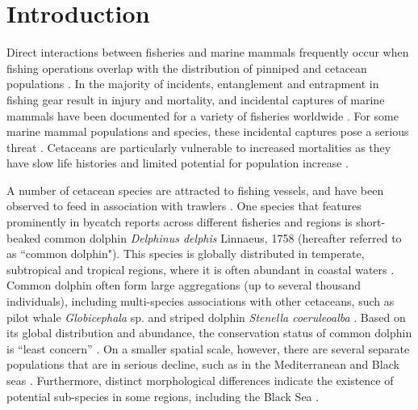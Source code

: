\documentclass[10pt]{article}
\begin{document}

\section*{Introduction}
Direct interactions between fisheries and marine mammals frequently occur when fishing operations overlap with the distribution of pinniped and cetacean populations \cite{chuenpagdee_collateral_2003, shaughnessy_review_2003, read_bycatch_2006}.  In the majority of incidents, entanglement and entrapment in fishing gear result in injury and mortality, and incidental captures of marine mammals have been documented for a variety of fisheries worldwide \cite{woodley_incidental_1991, fertl_cetacean_1997, hall_ecological_1998}.  For some marine mammal populations and species, these incidental captures pose a serious threat \cite{dawson_management_2005, reeves_global_2005, goldsworthy_risk_2007}.  Cetaceans are particularly vulnerable to increased mortalities as they have slow life histories and limited potential for population increase \cite{read_interactions_2008}.  

A number of cetacean species are attracted to fishing vessels, and have been observed to feed in association with trawlers \cite{chilvers_trawling_2001, rayment_observations_2009}.  One species that features prominently in bycatch reports across different fisheries and regions is short-beaked common dolphin \emph{Delphinus delphis} Linnaeus, 1758 (hereafter referred to as ``common dolphin")\cite{northridge_estimation_1996, tudela_driftnet_2005, mannocci_assessing_2012, boer_interactions_2012}.  This species is globally distributed in temperate, subtropical and tropical regions, where it is often abundant in coastal waters \cite{danil_growth_2007}.  Common dolphin often form large aggregations (up to several thousand individuals), including multi-species associations with other cetaceans, such as pilot whale \emph{Globicephala} sp. and striped dolphin \emph{Stenella coeruleoalba} \cite{frantzis_associations_2002, stockin_thesis_2008, stockin_factors_2008}.
Based on its global distribution and abundance, the conservation
status of common dolphin is ``least concern'' \cite{hammond_delphinus_2008}. On a smaller spatial scale, however, there are several separate populations that are in serious decline, such as in the Mediterranean and Black seas \cite{reeves_dolphins_2003}.  Furthermore, distinct morphological differences indicate the existence of potential sub-species in some regions, including the Black Sea \cite{hammond_delphinus_2008}.
\end{document}
